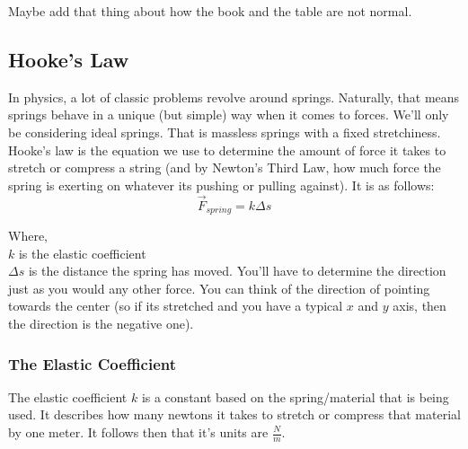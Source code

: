 Maybe add that thing about how the book and the table are not normal.

\subsection{Hooke's Law}
In physics, a lot of classic problems revolve around springs. Naturally, that means springs behave in a unique (but simple) way when it comes to
forces. We'll only be considering ideal springs. That is massless springs with a fixed stretchiness. Hooke's law is the equation we use to determine 
the amount of force it takes to stretch or compress a string (and by Newton's Third Law, how much force the spring is exerting on whatever its pushing
or pulling against). It is as follows:
\begin{equation}\label{eq : hooke}
    \vec{F}_{spring} = k \Delta s
\end{equation}

\noindent Where, \\
\indent $k$ is the elastic coefficient \\
\indent $\Delta s$ is the distance the spring has moved. You'll have to determine the direction just as you would any other force. You can think of
the direction of pointing towards the center (so if its stretched and you have a typical $x$ and $y$ axis, then the direction is the negative one).

\subsubsection{The Elastic Coefficient}
The elastic coefficient $k$ is a constant based on the spring/material that is being used. It describes how many newtons it takes to stretch or 
compress that material by one meter. It follows then that it's units are $\frac{N}{m}$.